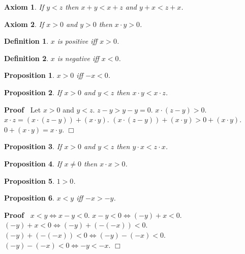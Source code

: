 \documentclass{article}
\newenvironment{forthel}{\begin{leftbar}}{\end{leftbar}}
\newenvironment{proof}{\noindent\textbf{Proof\ }}{\hspace*{\fill}$\Box$\medskip}
\newtheorem{axiom}{Axiom}
\newtheorem{definition}{Definition}
\newtheorem{proposition}{Proposition}
\begin{document}
\begin{forthel}

\begin{axiom} If $y < z$ then $x + y < x + z$ and $y + x < z + x$.
\end{axiom}

\begin{axiom} If $x > 0$ and $y > 0$ then $x \cdot y > 0$.
\end{axiom}

\begin{definition} $x$ is \emph{positive} iff $x > 0$.
\end{definition}

\begin{definition} $x$ is \emph{negative} iff $x < 0$.
\end{definition}


\begin{proposition} $x > 0$ iff $-x < 0$. \end{proposition}

\begin{proposition} If $x > 0$ and $y < z$ then $x \cdot y < x \cdot z$.
\end{proposition}
\begin{proof} Let $x > 0$ and $y < z$.
$z - y > y - y = 0$.
$x \cdot (z - y) > 0$.
$x \cdot z = (x \cdot (z - y)) + (x \cdot y)$.
$(x \cdot (z - y)) + (x \cdot y)  > 0 + (x \cdot y)$.
$0 + (x \cdot y) = x \cdot y$.
\end{proof}

\begin{proposition} If $x > 0$ and $y < z$ then 
$y \cdot x < z \cdot x$.
\end{proposition}

\begin{proposition} If $x \neq 0$ then $x \cdot x > 0$.
\end{proposition}


\begin{proposition} $1 > 0$.\end{proposition}


\begin{proposition} $x < y$ iff $-x > -y$.\end{proposition}
\begin{proof}
$x < y \Leftrightarrow x - y < 0$. 
$x - y < 0 \Leftrightarrow (-y) + x < 0$. 
$(-y) + x < 0 \Leftrightarrow (-y)+(-(-x)) < 0$.
$(-y)+(-(-x)) < 0 \Leftrightarrow (-y)-(-x) < 0$.
$(-y)-(-x) < 0 \Leftrightarrow -y < -x$.
\end{proof}


\end{forthel}
\end{document}
